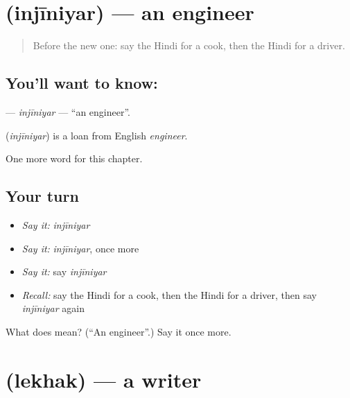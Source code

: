 \section[\texorpdfstring{\hi{इंजीनियर} (injīniyar)}{इंजीनियर (injīniyar)}]{ (injīniyar) — an engineer}

\label{lesson:HI-C194-injiniyar}



\begin{quote}
Before the new one: say the Hindi for a cook, then the Hindi for a driver.
\end{quote}

\subsection*{You'll want to know: }
\textbf{} — \emph{injīniyar} — \textquotedblleft{}an engineer\textquotedblright{}.

\begin{cousinweb}
\textbf{} (\emph{injīniyar}) is a loan from English \emph{engineer}.
\end{cousinweb}

\begin{grammarlens}[title={What you've built}]
One more word for this chapter.
\end{grammarlens}

\subsection*{Your turn}
\begin{itemize}
\raggedright
  \item \emph{Say it:} \emph{injīniyar}
  \item \emph{Say it:} \emph{injīniyar}, once more
  \item \emph{Say it:} say \emph{injīniyar}
  \item \emph{Recall:} say the Hindi for a cook, then the Hindi for a driver, then say \emph{injīniyar} again
\end{itemize}

\begin{tcolorbox}[breakable,colback=teal!4,colframe=teal!35!black,title={Before you move on}]
What does  mean? (\textquotedblleft{}An engineer\textquotedblright{}.) Say it once more.
\end{tcolorbox}
\section[\texorpdfstring{\hi{लेखक} (lekhak)}{लेखक (lekhak)}]{ (lekhak) — a writer}

